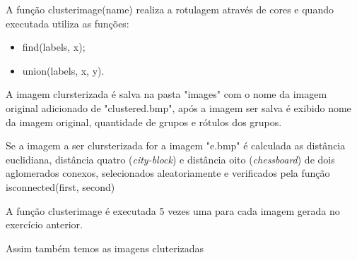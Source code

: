 \documentclass[10pt,a4paper]{article}
\begin{document}
\begin{flushleft}
A função {\ttfamily cluster\textunderscore image(name)} realiza a rotulagem através de cores e quando executada utiliza as funções:
\end{flushleft}

\begin{itemize}
   \item {\ttfamily find(labels, x)};
   \item {\ttfamily union(labels, x, y)}.
 \end{itemize}

\begin{flushleft}
A imagem clursterizada é salva na pasta "images" com o nome da imagem original adicionado de "\textunderscore clustered.bmp", após a imagem ser salva é exibido nome da imagem original, quantidade de grupos e rótulos dos grupos. 
\end{flushleft}

\begin{flushleft}
Se a imagem a ser clursterizada for a imagem "e.bmp" é calculada as distância euclidiana, distância quatro (\textit{city-block}) e distância oito (\textit{chessboard}) de dois aglomerados conexos, selecionados aleatoriamente e verificados pela função {\ttfamily is\textunderscore connected(first, second)}
\end{flushleft}

\begin{flushleft}
A função {\ttfamily cluster\textunderscore image} é executada 5 vezes uma para cada imagem gerada no exercício anterior.
\end{flushleft}



\begin{flushleft}
Assim também temos as imagens cluterizadas
\end{flushleft}
\end{document}
